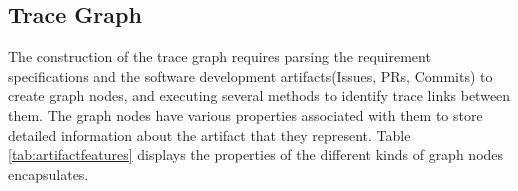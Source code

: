 

\subsection{Trace Graph}
\label{sec:tgraph}

The construction of the trace graph requires parsing the requirement specifications and the software development artifacts(Issues, PRs, Commits) to create graph nodes, and executing several methods to identify trace links between them. The graph nodes have various properties associated with them to store detailed information about the artifact that they represent.
Table \ref{tab:artifactfeatures} displays the properties of the different kinds of graph nodes encapsulates.


